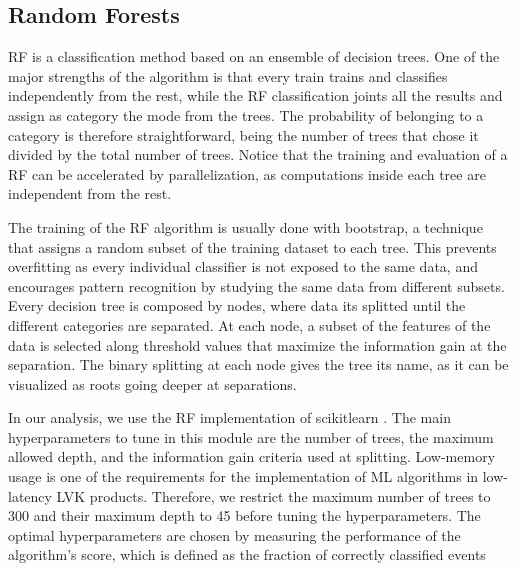 \subsection*{Random Forests}

\ac{RF} is a classification method based on an ensemble of decision trees.  One of the major strengths of the algorithm is that  every train trains and classifies independently from the rest, while the RF classification joints all the results and assign as category the mode from the trees. The probability of belonging to a category is therefore straightforward, being the number of trees that chose it divided by the total number of trees. Notice that the training and evaluation of a RF can be accelerated by parallelization, as computations inside each tree are independent from the rest.

 The training of the \ac{RF} algorithm is usually done with bootstrap, a technique that assigns a random subset of the training dataset to each tree. This prevents overfitting as every individual classifier is not exposed to the same data, and encourages pattern recognition by studying the same data from different subsets. Every decision tree is composed by nodes, where data its splitted until the different categories are separated. At each node, a subset of the features of the data is selected along threshold values that maximize the information gain at the separation. The binary splitting at each node gives the tree its name, as it can be visualized as roots going deeper at separations.

In our analysis, we use the \ac{RF} implementation of scikitlearn \citep{Pedregosa:2011}. The main hyperparameters  to tune in this module are the number of trees, the maximum allowed depth, and the information gain criteria used at splitting.  Low-memory usage is one of the requirements for the implementation of \ac{ML} algorithms in low-latency \ac{LVK} products. Therefore, we restrict the maximum number of trees to 300 and their maximum depth to 45 before tuning the hyperparameters. The optimal hyperparameters are chosen by measuring the performance of the algorithm's score, which is defined as the fraction of correctly classified events   


 



